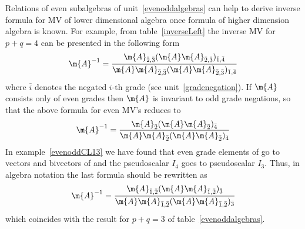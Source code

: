 %
\begin{example}
Relations of even subalgebras of unit~\ref{evenoddalgebras} can help 
to derive inverse formula for MV of lower dimensional algebra once
formula of higher dimension algebra is known. For example, from table~\ref{inverseLeft} the inverse MV for $p+q=4$ can be presented in the following form
\[ \m{A}^{-1}=\frac{\m{A}_{\bar 2,\bar 3}(\m{A}\m{A}_{\bar 2,\bar 3})_{\bar 1,\bar 4}}
{\m{A}\m{A}_{\bar 2,\bar 3}(\m{A}\m{A}_{\bar 2,\bar 3})_{\bar
1,\bar 4}}\] where ${\bar i}$ denotes the negated $i$-th grade (see unit~\ref{gradenegation}). If $\m{A}$ consists only of
even grades then $\m{A}$ is invariant to odd grade negations,
so that the above formula for even MV's reduces to
\[ \m{A}^{-1}=\frac{\m{A}_{\bar 2}(\m{A}\m{A}_{\bar 2})_{\bar 4}}
{\m{A}\m{A}_{\bar 2}(\m{A}\m{A}_{\bar 2})_{\bar 4}}\] In
example~\ref{evenoddCL13} we have found that even grade elements
of   go to vectors and bivectors of  and the
pseudoscalar $I_4$ goes to pseudoscalar $I_3$. Thus, in 
algebra notation the last formula  should be rewritten as
\[ \m{A}^{-1}=\frac{\m{A}_{\bar1,\bar 2}(\m{A}\m{A}_{\bar1,\bar 2})_{\bar 3}}
{\m{A}\m{A}_{\bar 1,\bar 2}(\m{A}\m{A}_{\bar 1,\bar 2})_{\bar
3}}\] which coincides with the result for
$p+q=3$ of table~\ref{evenoddalgebras}.
\end{example}
%
